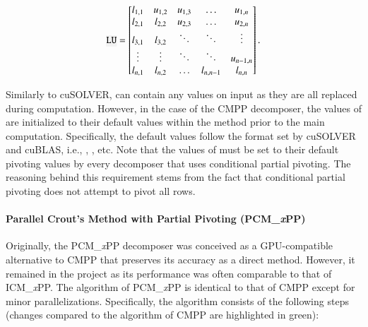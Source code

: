 \begin{equation}
	\code{LU} = {
		\begin{bmatrix}
			l _{1,1} & u _{1,2} & u _{1,3} & \ldots    & u _{1,n}   \\
			l_{2,1}	 & l _{2,2} & u _{2,3} & \ldots    & u _{2,n}   \\
			l_{3,1}  & l_{3,2} 	& \ddots   & \ddots    & \vdots 	 \\
			\vdots   & \vdots	& \ddots   & \ddots    & u _{n-1,n} \\
			l_{n,1}	 & l_{n,2}	& \ldots   & l_{n,n-1} & l _{n,n}
		\end{bmatrix}
	} \,.
	\label{Equation:implementation->decomposition-project->implemented-solutions->decomposers->CMPP}
\end{equation}

Similarly to cuSOLVER,  can contain any values on input as they are all replaced during computation.
However, in the case of the CMPP decomposer, the values of  are initialized to their default values within the  method prior to the main computation.
Specifically, the default values follow the format set by cuSOLVER and cuBLAS, i.e., , , etc.
Note that the values of  must be set to their default pivoting values by every decomposer that uses conditional partial pivoting.
The reasoning behind this requirement stems from the fact that conditional partial pivoting does not attempt to pivot all rows.

\paragraph{Parallel Crout's Method with Partial Pivoting (PCM\_\textit{x}PP)}\label{Paragraph:implementation->decomposition-project->implemented-solutions->decomposers->PCMxPP}
Originally, the PCM\_\textit{x}PP decomposer was conceived as a GPU-compatible alternative to CMPP that preserves its accuracy as a direct method.
However, it remained in the project as its performance was often comparable to that of ICM\_\textit{x}PP.
The algorithm of PCM\_\textit{x}PP is identical to that of CMPP except for minor parallelizations.
Specifically, the algorithm consists of the following steps (changes compared to the algorithm of CMPP are highlighted in green):

